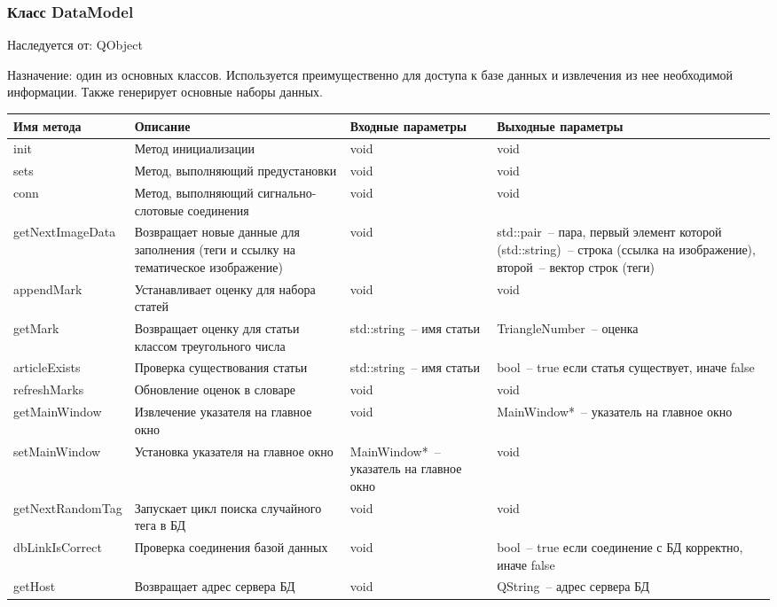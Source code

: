 \documentclass[a4paper,14pt,russian]{extreport}
\begin{document}
\subsubsection{Класс DataModel}

Наследуется от: QObject

Назначение: один из основных классов. Используется преимущественно для доступа к базе данных и извлечения из нее необходимой информации. Также генерирует основные наборы данных.

\newpage

\begin{longtable}{|m{3 cm}|m{3 cm}|m{4 cm}|m{4 cm}|}
\hline
Имя метода & Описание & Входные параметры & Выходные параметры \\
\hline
init & Метод инициализации & void & void \\
\hline
sets & Метод, выполняющий предустановки & void & void \\
\hline
conn & Метод, выполняющий сигнально-слотовые соединения & void & void \\
\hline
{getNext\-ImageData} & Возвращает новые данные для заполнения (теги и ссылку на тематическое изображение) & void & std::pair~-- пара, первый элемент которой (std::string)~-- строка (ссылка на изображение), второй~-- вектор строк (теги) \\
\hline
appendMark & Устанавливает оценку для набора статей & void & void \\
\hline
getMark & Возвращает оценку для статьи классом треугольного числа & std::string~-- имя статьи & TriangleNumber~-- оценка \\
\hline
articleExists & Проверка существования статьи & std::string~-- имя статьи & bool~-- true если статья существует, иначе false \\
\hline
refreshMarks & Обновление оценок в словаре & void & void \\
\hline
{getMain\-Window} & Извлечение указателя на главное окно & void & MainWindow*~-- указатель на главное окно \\
\hline
{setMain\-Window} & Установка указателя на главное окно & MainWindow*~-- указатель на главное окно & void \\
\hline
{getNext\-RandomTag} & Запускает цикл поиска случайного тега в БД & void & void \\
\hline
{dbLink\-IsCorrect} & Проверка соединения базой данных & void & bool~-- true если соединение с БД корректно, иначе false \\
\hline
getHost & Возвращает адрес сервера БД & void & QString~-- адрес сервера БД \\

\end{longtable}
\end{document}

